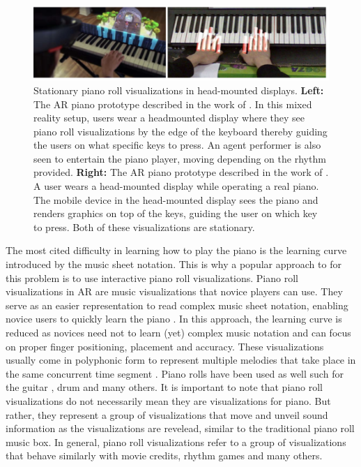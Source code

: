 \documentclass[manuscript,screen]{acmart}
\begin{document}
\begin{figure}[h]
    \centering
    \includegraphics[width=15cm]{figures/dashuang.png}
    \caption{Stationary piano roll visualizations in head-mounted displays. \textbf{Left:} The AR piano prototype described in the work of \citet{das2017music}. In this mixed reality setup, users wear a headmounted display where they see piano roll visualizations by the edge of the keyboard thereby guiding the users on what specific keys to press. An agent performer is also seen to entertain the piano player, moving depending on the rhythm provided. \textbf{Right:} The AR piano prototype described in the work of \citet{huang2011piano}. A user wears a head-mounted display while operating a real piano. The mobile device in the head-mounted display sees the piano and renders graphics on top of the keys, guiding the user on which key to press. Both of these visualizations are stationary.  }
    \label{fig:dashuang}
\end{figure}

The most cited difficulty in learning how to play the piano is the learning curve introduced by the music sheet notation. This is why a popular approach to for this problem is to use interactive piano roll visualizations. Piano roll visualizations in AR are music visualizations that novice players can use. They serve as an easier representation to read complex music sheet notation, enabling novice users to quickly learn the piano \cite{walder2016modelling}. In this approach, the learning curve is reduced as novices need not to learn (yet) complex music notation and can focus on proper finger positioning, placement and accuracy. These visualizations usually come in polyphonic form to represent multiple melodies that take place in the same concurrent time segment \cite{ciuha2010visualization}.  Piano rolls have been used as well such for the guitar \cite{biamonte2010musical}, drum \cite{rossignol2015alternate} and many others. It is important to note that piano roll visualizations do not necessarily mean they are visualizations for piano. But rather, they represent a group of visualizations that move and unveil sound information as the visualizations are revelead, similar to the traditional piano roll music box. In general, piano roll visualizations refer to a group of visualizations that behave similarly with movie credits, rhythm games and many others. 
\end{document}
